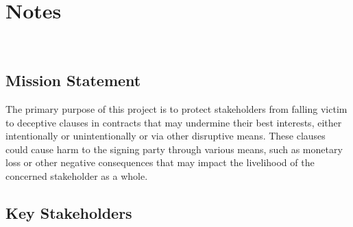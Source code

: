 \chapter{Notes 
\label{Chapter::Notes}}\
\section{Mission Statement \label{Section::Mission Statement} }
The primary purpose of this project is to protect stakeholders from falling victim to deceptive clauses in contracts that may undermine their best interests, either intentionally or unintentionally or via other disruptive means. These clauses could cause harm to the signing party through various means, such as monetary loss or other negative consequences that may impact the livelihood of the concerned stakeholder as a whole. 

\section{Key Stakeholders \label{Section::Key Stakeholders} }





